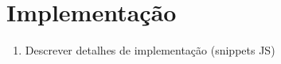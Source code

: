 \section{Implementação}

\begin{enumerate}
\item Descrever detalhes de implementação (snippets JS)
\end{enumerate}


